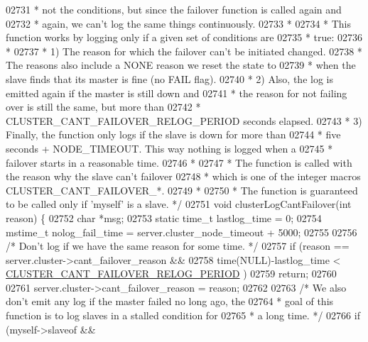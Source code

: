 \begin{DoxyCode}
{{{{{{{{{{{{{{{{{{{{{{{{{{{{{{{{{{{{{{{{{{{{{{{{{{02731 \textcolor{comment}{ * not the conditions, but since the failover function is called again and}
02732 \textcolor{comment}{ * again, we can't log the same things continuously.}
02733 \textcolor{comment}{ *}
02734 \textcolor{comment}{ * This function works by logging only if a given set of conditions are}
02735 \textcolor{comment}{ * true:}
02736 \textcolor{comment}{ *}
02737 \textcolor{comment}{ * 1) The reason for which the failover can't be initiated changed.}
02738 \textcolor{comment}{ *    The reasons also include a NONE reason we reset the state to}
02739 \textcolor{comment}{ *    when the slave finds that its master is fine (no FAIL flag).}
02740 \textcolor{comment}{ * 2) Also, the log is emitted again if the master is still down and}
02741 \textcolor{comment}{ *    the reason for not failing over is still the same, but more than}
02742 \textcolor{comment}{ *    CLUSTER\_CANT\_FAILOVER\_RELOG\_PERIOD seconds elapsed.}
02743 \textcolor{comment}{ * 3) Finally, the function only logs if the slave is down for more than}
02744 \textcolor{comment}{ *    five seconds + NODE\_TIMEOUT. This way nothing is logged when a}
02745 \textcolor{comment}{ *    failover starts in a reasonable time.}
02746 \textcolor{comment}{ *}
02747 \textcolor{comment}{ * The function is called with the reason why the slave can't failover}
02748 \textcolor{comment}{ * which is one of the integer macros CLUSTER\_CANT\_FAILOVER\_*.}
02749 \textcolor{comment}{ *}
02750 \textcolor{comment}{ * The function is guaranteed to be called only if 'myself' is a slave. */}
02751 \textcolor{keywordtype}{void} clusterLogCantFailover(\textcolor{keywordtype}{int} reason) \{
02752     \textcolor{keywordtype}{char} *msg;
02753     \textcolor{keyword}{static} time\_t lastlog\_time = 0;
02754     mstime\_t nolog\_fail\_time = server.cluster\_node\_timeout + 5000;
02755 
02756     \textcolor{comment}{/* Don't log if we have the same reason for some time. */}
02757     \textcolor{keywordflow}{if} (reason == server.cluster->cant\_failover\_reason &&
02758         time(NULL)-lastlog\_time < \hyperlink{cluster_8h_aacc3855ff190c34f59896bb99655dcf8}{CLUSTER\_CANT\_FAILOVER\_RELOG\_PERIOD}
      )
02759         \textcolor{keywordflow}{return};
02760 
02761     server.cluster->cant\_failover\_reason = reason;
02762 
02763     \textcolor{comment}{/* We also don't emit any log if the master failed no long ago, the}
02764 \textcolor{comment}{     * goal of this function is to log slaves in a stalled condition for}
02765 \textcolor{comment}{     * a long time. */}
02766     \textcolor{keywordflow}{if} (myself->slaveof &&
}}}}}}}}}}}}}}}}}}}}}}}}}}}}}}}}}}}}}}}}}}}}}}}}}}
\end{DoxyCode}
